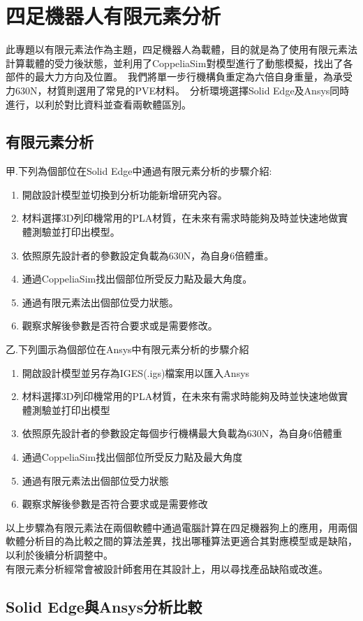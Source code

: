 \chapter{四足機器人有限元素分析}

此專題以有限元素法作為主題，四足機器人為載體，目的就是為了使用有限元素法計算載體的受力後狀態，並利用了CoppeliaSim對模型進行了動態模擬，找出了各部件的最大力方向及位置。\
我們將單一步行機構負重定為六倍自身重量，為承受力630N，材質則選用了常見的PVE材料。\
分析環境選擇Solid Edge及Ansys同時進行，以利於對比資料並查看兩軟體區別。\\

\section{有限元素分析}

甲.下列為個部位在Solid Edge中通過有限元素分析的步驟介紹:\\
\begin{enumerate}
\item 開啟設計模型並切換到分析功能新增研究內容。\\
\item 材料選擇3D列印機常用的PLA材質，在未來有需求時能夠及時並快速地做實體測驗並打印出模型。\\
\item 依照原先設計者的參數設定負載為630N，為自身6倍體重。\\
\item 通過CoppeliaSim找出個部位所受反力點及最大角度。\\
\item 通過有限元素法出個部位受力狀態。\\
\item 觀察求解後參數是否符合要求或是需要修改。\\
\end {enumerate}

乙.下列圖示為個部位在Ansys中有限元素分析的步驟介紹
\begin{enumerate}
\item 開啟設計模型並另存為IGES(.igs)檔案用以匯入Ansys
\item 材料選擇3D列印機常用的PLA材質，在未來有需求時能夠及時並快速地做實體測驗並打印出模型
\item 依照原先設計者的參數設定每個步行機構最大負載為630N，為自身6倍體重
\item 通過CoppeliaSim找出個部位所受反力點及最大角度
\item 通過有限元素法出個部位受力狀態
\item 觀察求解後參數是否符合要求或是需要修改
\end{enumerate}

以上步驟為有限元素法在兩個軟體中通過電腦計算在四足機器狗上的應用，用兩個軟體分析目的為比較之間的算法差異，找出哪種算法更適合其對應模型或是缺陷，以利於後續分析調整中。\\
有限元素分析經常會被設計師套用在其設計上，用以尋找產品缺陷或改進。\\

\newpage

\section{Solid Edge與Ansys分析比較}

\newpage
